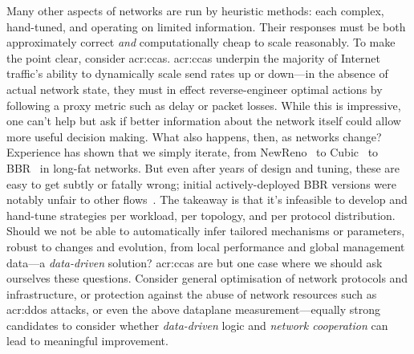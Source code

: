 Many other aspects of networks are run by heuristic methods: each complex, hand-tuned, and operating on limited information.
Their responses must be both approximately correct \emph{and} computationally cheap to scale reasonably.
To make the point clear, consider \glspl{acr:cca}.
\glspl{acr:cca} underpin the majority of Internet traffic's ability to dynamically scale send rates up or down---in the absence of actual network state, they must in effect reverse-engineer optimal actions by following a proxy metric such as delay or packet losses.
While this is impressive, one can't help but ask if better information about the network itself could allow more useful decision making.
What also happens, then, as networks change? %
Experience has shown that we simply iterate, from NewReno~\parencite{rfc6582} to Cubic~\parencite{rfc8312} to BBR~\parencite{DBLP:journals/queue/CardwellCGYJ16} in long-fat networks.
But even after years of design and tuning, these are easy to get subtly or fatally wrong; initial actively-deployed BBR versions were notably unfair to other flows~\parencite{DBLP:conf/imc/WareMSS19}.
The takeaway is that it's infeasible to develop and hand-tune strategies per workload, per topology, and per protocol distribution.
Should we not be able to automatically infer tailored mechanisms or parameters, robust to changes and evolution, from local performance and global management data---a \emph{data-driven} solution?
\glspl{acr:cca} are but one case where we should ask ourselves these questions.
Consider general optimisation of network protocols and infrastructure, or protection against the abuse of network resources such as \gls{acr:ddos} attacks, or even the above dataplane measurement---equally strong candidates to consider whether \emph{data-driven} logic and \emph{network cooperation} can lead to meaningful improvement.


